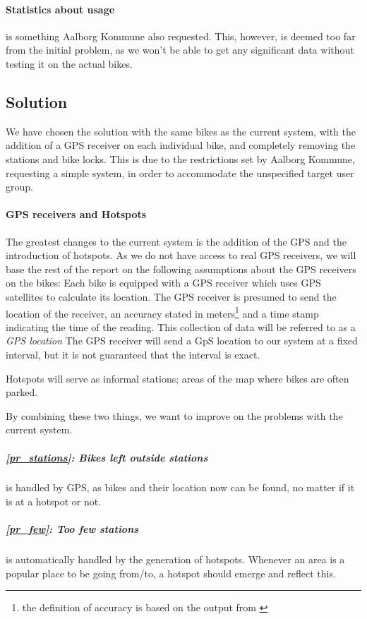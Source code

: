 \paragraph{Statistics about usage} is something Aalborg Kommune also requested.
This, however, is deemed too far from the initial problem, as we won't be able to get any significant data without testing it on the actual bikes.

\subsection{Solution} \label{prob_statement:solution}
We have chosen the solution with the same bikes as the current system, with the addition of a GPS receiver on each individual bike, and completely removing the stations and bike locks.
This is due to the restrictions set by Aalborg Kommune, requesting a simple system, in order to accommodate the unspecified target user group.

\paragraph{GPS receivers and Hotspots}\label{gpsreceiver}
The greatest changes to the current system is the addition of the GPS and the introduction of hotspots.
As we do not have access to real GPS receivers, we will base the rest of the report on the following assumptions about the GPS receivers on the bikes:
Each bike is equipped with a GPS receiver which uses GPS satellites to calculate its location. The GPS receiver is presumed to send the location of the receiver, an accuracy stated in meters\footnote{the definition of accuracy is based on the output from \citet{followmee}} and a time stamp indicating the time of the reading.
This collection of data will be referred to as a \emph{GPS location}	
The GPS receiver will send a GpS location to our system at a fixed interval, but it is not guaranteed that the interval is exact.

Hotspots will serve as informal stations; areas of the map where bikes are often parked.

By combining these two things, we want to improve on the problems with the current system.

\subparagraph{\ref{pr_stations}: Bikes left outside stations} is handled by GPS, as bikes and their location now can be found, no matter if it is at a hotspot or not.

\subparagraph{\ref{pr_few}: Too few stations} is automatically handled by the generation of hotspots.
Whenever an area is a popular place to be going from/to, a hotspot should emerge and reflect this.

